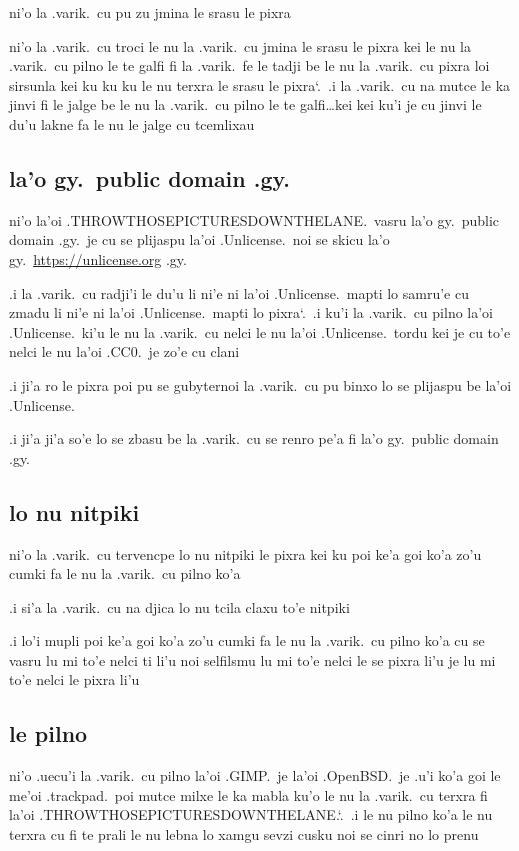 \documentclass{report}
\newcommand\sds{\spacefactor\sfcode`.\ \space}
\begin{document}
ni'o la .varik.\ cu pu zu jmina le srasu le pixra

ni'o la .varik.\ cu troci le nu la .varik.\ cu jmina le srasu le pixra kei le nu la .varik.\ cu pilno le te galfi fi la .varik.\ fe le tadji be le nu la .varik.\ cu pixra loi sirsunla kei ku ku ku le nu terxra le srasu le pixra\sds  .i la .varik.\ cu na mutce le ka jinvi fi le jalge be le nu la .varik.\ cu pilno le te galfi\ldots kei kei ku'i je cu jinvi le du'u lakne fa le nu le jalge cu tcemlixau

\subsection{la'o gy.\ public domain .gy.}
ni'o la'oi .THROWTHOSEPICTURESDOWNTHELANE.\ vasru la'o gy.\ public domain .gy.\ je cu se plijaspu la'oi .Unlicense.\ noi se skicu la'o gy.\ \url{https://unlicense.org} .gy.

.i la .varik.\ cu radji'i le du'u li ni'e ni la'oi .Unlicense.\ mapti lo samru'e cu zmadu li ni'e ni la'oi .Unlicense.\ mapti lo pixra\sds  .i ku'i la .varik.\ cu pilno la'oi .Unlicense.\ ki'u le nu la .varik.\ cu nelci le nu la'oi .Unlicense.\ tordu kei je cu to'e nelci le nu la'oi .CC0.\ je zo'e cu clani

.i ji'a ro le pixra poi pu se gubyternoi la .varik.\ cu pu binxo lo se plijaspu be la'oi .Unlicense.

.i ji'a ji'a so'e lo se zbasu be la .varik.\ cu se renro pe'a fi la'o gy.\ public domain .gy.

\subsection{lo nu nitpiki}
ni'o la .varik.\ cu tervencpe lo nu nitpiki le pixra kei ku poi ke'a goi ko'a zo'u cumki fa le nu la .varik.\ cu pilno ko'a

.i si'a la .varik.\ cu na djica lo nu tcila claxu to'e nitpiki

.i lo'i mupli poi ke'a goi ko'a zo'u cumki fa le nu la .varik.\ cu pilno ko'a cu se vasru lu mi to'e nelci ti li'u noi selfilsmu lu mi to'e nelci le se pixra li'u je lu mi to'e nelci le pixra li'u

\subsection{le pilno}
ni'o .uecu'i la .varik.\ cu pilno la'oi .GIMP.\ je la'oi .OpenBSD.\ je .u'i ko'a goi le me'oi .trackpad.\ poi mutce milxe le ka mabla ku'o le nu la .varik.\ cu terxra fi la'oi .THROWTHOSEPICTURESDOWNTHELANE.\sds  .i le nu pilno ko'a le nu terxra cu fi te prali le nu lebna lo xamgu sevzi cusku noi se cinri no lo prenu
\end{document}
